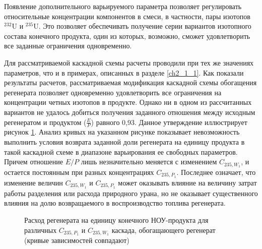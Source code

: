 Появление дополнительного варьируемого параметра позволяет регулировать относительные концентрации компонентов в смеси, в частности, пары изотопов $^{232}$U и $^{235}$U. Это позволяет обеспечивать получение серии вариантов изотопного состава конечного продукта, один из которых, возможно, сможет удовлетворить все заданные ограничения одновременно. 

Для рассматриваемой каскадной схемы расчеты проводили при тех же значениях параметров, что и в примерах, описанных в разделе \ref{ch2_1_1}. Как показали результаты расчетов, рассматриваемая модификация каскадной схемы обогащения регенерата позволяет одновременно удовлетворить все ограничения на концентрации четных изотопов в продукте. Однако ни в одном из рассчитанных вариантов не удалось добиться получения заданного отношения между исходным регенератом и продуктом ($\frac{E}{P}$) равного 0,93. Данное утверждение иллюстрирует рисунок \ref{Figure_10}. Анализ кривых на указанном рисунке показывает невозможность выполнить условия возврата заданной доли регенерата на единицу продукта в такой каскадной схеме в диапазоне варьирования ее свободных параметров. Причем отношение ${E}{/}{P}$ лишь незначительно меняется с изменением $C_{235, W_1}$, и остается постоянным при разных концентрациях $C_{235, P_1}$. Последнее означает, что изменение величин $C_{235, W_1}$ и $C_{235, P_1}$ может оказывать влияние на величину затрат работы разделения или расхода природного урана, но не оказывает существенного влияния на долю возвращаемого в воспроизводство топлива регенерата.

\begin{figure}[ht]
  \caption{Расход регенерата на единицу конечного НОУ-продукта для различных  $C_{235, P_1}$ и $C_{235, W_1}$ каскада, обогащающего регенерат (кривые зависимостей совпадают)}\label{Figure_10}
\end{figure}

